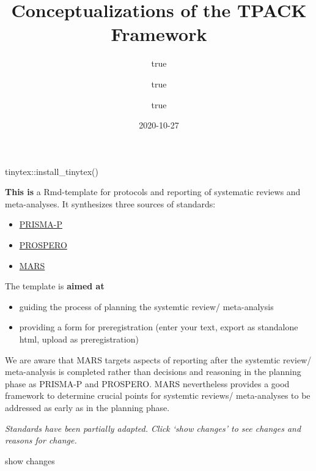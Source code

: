 \documentclass[
]{article}
\title{Conceptualizations of the TPACK Framework}
\author{true \and true \and true}
\date{2020-10-27}
\providecommand{\tightlist}{%
  \setlength{\itemsep}{0pt}\setlength{\parskip}{0pt}}
\begin{document}
\maketitle

tinytex::install\_tinytex()

\textbf{This is} a Rmd-template for protocols and reporting of
systematic reviews and meta-analyses. It synthesizes three sources of
standards:

\begin{itemize}
\tightlist
\item
  \href{https://doi.org/10.1136/bmj.i4086}{PRISMA-P}
\item
  \href{https://www.crd.york.ac.uk/prospero/}{PROSPERO}
\item
  \href{https://doi.org/10.1037/amp0000389}{MARS}
\end{itemize}

The template is \textbf{aimed at}

\begin{itemize}
\tightlist
\item
  guiding the process of planning the systemtic review/ meta-analysis
\item
  providing a form for preregistration (enter your text, export as
  standalone html, upload as preregistration)
\end{itemize}

We are aware that MARS targets aspects of reporting after the systemtic
review/ meta-analysis is completed rather than decisions and reasoning
in the planning phase as PRISMA-P and PROSPERO. MARS nevertheless
provides a good framework to determine crucial points for systemtic
reviews/ meta-analyses to be addressed as early as in the planning
phase.

\emph{Standards have been partially adapted. Click `show changes' to see
changes and reasons for change.}

show changes
\end{document}
